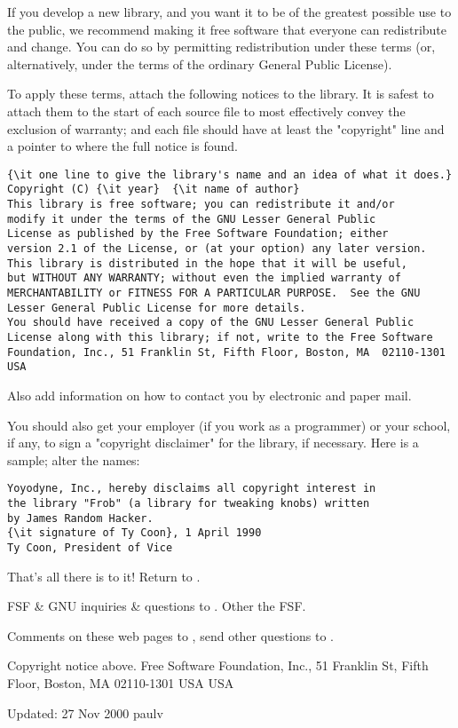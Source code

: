 If you develop a new library, and you want it to be of the greatest possible
use to the public, we recommend making it free software that everyone can
redistribute and change. You can do so by permitting redistribution under
these terms (or, alternatively, under the terms of the ordinary General Public
License).

To apply these terms, attach the following notices to the library. It is
safest to attach them to the start of each source file to most effectively
convey the exclusion of warranty; and each file should have at least the
"copyright" line and a pointer to where the full notice is found.

\footnotesize
\begin{verbatim}
{\it one line to give the library's name and an idea of what it does.}
Copyright (C) {\it year}  {\it name of author}
This library is free software; you can redistribute it and/or
modify it under the terms of the GNU Lesser General Public
License as published by the Free Software Foundation; either
version 2.1 of the License, or (at your option) any later version.
This library is distributed in the hope that it will be useful,
but WITHOUT ANY WARRANTY; without even the implied warranty of
MERCHANTABILITY or FITNESS FOR A PARTICULAR PURPOSE.  See the GNU
Lesser General Public License for more details.
You should have received a copy of the GNU Lesser General Public
License along with this library; if not, write to the Free Software
Foundation, Inc., 51 Franklin St, Fifth Floor, Boston, MA  02110-1301
USA
\end{verbatim}
\normalsize

Also add information on how to contact you by electronic and paper mail.

You should also get your employer (if you work as a programmer) or your
school, if any, to sign a "copyright disclaimer" for the library, if
necessary. Here is a sample; alter the names:

\footnotesize
\begin{verbatim}
Yoyodyne, Inc., hereby disclaims all copyright interest in
the library "Frob" (a library for tweaking knobs) written
by James Random Hacker.
{\it signature of Ty Coon}, 1 April 1990
Ty Coon, President of Vice
\end{verbatim}
\normalsize

That's all there is to it!
Return to
.

FSF \& GNU inquiries \& questions to
. Other
 the FSF.

Comments on these web pages to
, send other
questions to
.

Copyright notice above.
Free Software Foundation, Inc., 51 Franklin St, Fifth Floor,
Boston, MA  02110-1301  USA
USA

Updated: 27 Nov 2000 paulv
